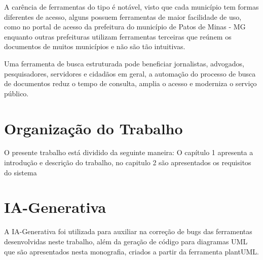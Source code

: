 A carência de ferramentas do tipo é notável, visto que cada município tem formas diferentes de acesso, alguns possuem ferramentas de maior facilidade de uso, como no portal de acesso da prefeitura do município de Patos de Minas - MG \cite{domsPatosDeMinas} enquanto outras prefeituras utilizam ferramentas terceiras que reúnem os documentos de muitos municípios e não são tão intuitivas.

Uma ferramenta de busca estruturada pode beneficiar jornalistas, advogados, pesquisadores, servidores e cidadãos em geral, a automação do processo de busca de documentos reduz o tempo de consulta, amplia o acesso e moderniza o serviço público.
\section{Organização do Trabalho}
O presente trabalho está dividido da seguinte maneira:  O capítulo 1 apresenta a introdução e descrição do trabalho, no capitulo 2 são apresentados os requisitos do sistema 

\section{IA-Generativa}
A IA-Generativa foi utilizada para auxiliar na correção de bugs das ferramentas desenvolvidas neste trabalho, além da geração de código para diagramas UML que são apresentados nesta monografia, criados a partir da ferramenta plantUML.